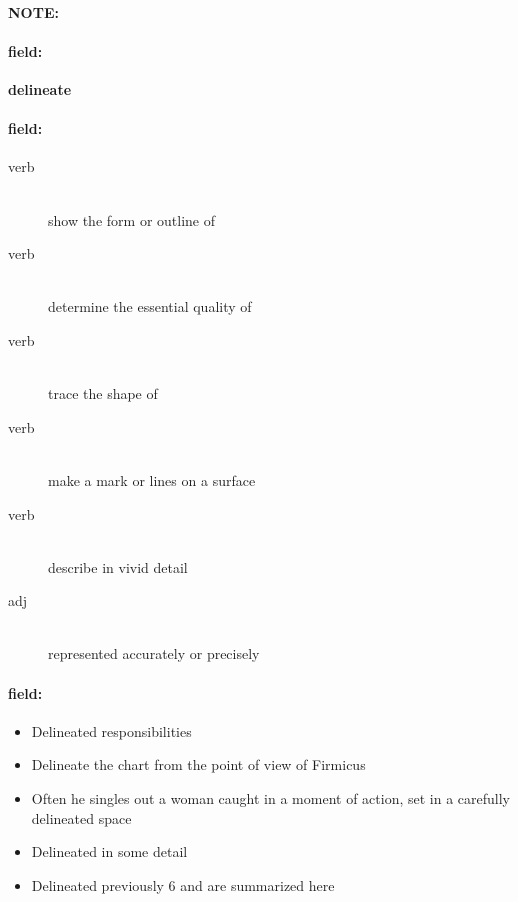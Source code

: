 \documentclass[12pt]{article}
\newenvironment{note}{\paragraph{NOTE:}}{}
\newenvironment{field}{\paragraph{field:}}{}
\begin{document}
\begin{note}
\begin{field}
\textbf{\large delineate}
\end{field}


\begin{field}
\begin{description}
\item[verb] \hfill \\ 
show the form or outline of

\item[verb] \hfill \\ 
determine the essential quality of

\item[verb] \hfill \\ 
trace the shape of

\item[verb] \hfill \\ 
make a mark or lines on a surface

\item[verb] \hfill \\ 
describe in vivid detail

\item[adj] \hfill \\ 
represented accurately or precisely

\end{description}
\end{field}

\begin{field}
\begin{itemize}
\item Delineated responsibilities
\item Delineate the chart from the point of view of Firmicus
\item Often he singles out a woman caught in a moment of action, set in a carefully delineated space
\item Delineated in some detail
\item Delineated previously 6 and are summarized here
\end{itemize}
\end{field}
\end{note}
\end{document}

